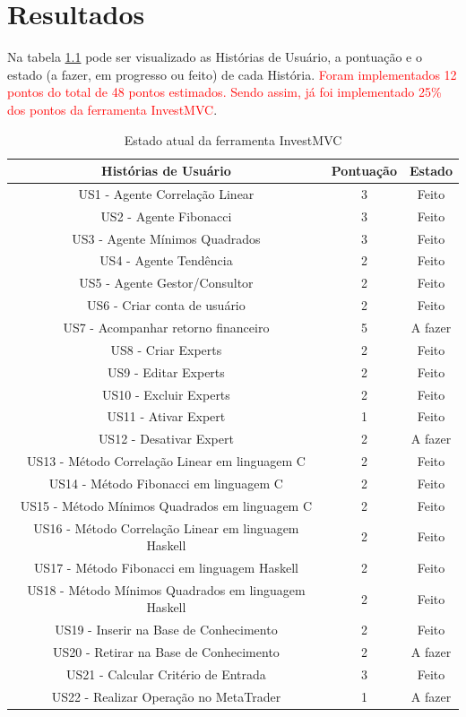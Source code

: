 \chapter{Resultados}

Na tabela \ref{estadoAtual} pode ser visualizado as Histórias de Usuário, a pontuação e o estado (a fazer, em progresso ou feito) de cada História. \textcolor{red}{Foram implementados 12 pontos do total de 48 pontos estimados. Sendo assim, já foi implementado 25\% dos pontos da ferramenta InvestMVC}.

\begin{table}[H]
\caption{Estado atual da ferramenta InvestMVC}
\begin{center}
    \begin{tabular}{ | c | c | c |}
    \hline
    \textbf{Histórias de Usuário} & \textbf{Pontuação} & \textbf{Estado} \\ \hline

US1 - Agente Correlação Linear & 3 & Feito\\ \hline
US2 - Agente Fibonacci & 3 & Feito \\ \hline
US3 - Agente Mínimos Quadrados & 3 & Feito\\ \hline
US4 -  Agente Tendência & 2 & Feito\\ \hline
US5 - Agente Gestor/Consultor & 2& Feito\\ \hline
US6 - Criar conta de usuário & 2 & Feito\\ \hline
US7 - Acompanhar retorno financeiro & 5 & A fazer\\ \hline
US8 - Criar Experts & 2 & Feito\\ \hline
US9 - Editar Experts & 2 & Feito\\ \hline
US10 - Excluir Experts & 2 & Feito\\ \hline
US11 - Ativar Expert & 1 & Feito\\ \hline
US12 - Desativar Expert & 2 & A fazer \\ \hline
US13 - Método Correlação Linear em linguagem C & 2 & Feito\\ \hline
US14 - Método Fibonacci em linguagem C & 2 & Feito\\ \hline
US15 - Método Mínimos Quadrados em linguagem C & 2 & Feito\\ \hline
US16 - Método Correlação Linear em linguagem Haskell & 2 & Feito\\ \hline
US17 - Método Fibonacci em linguagem Haskell & 2 & Feito\\ \hline
US18 - Método Mínimos Quadrados em linguagem Haskell & 2 & Feito\\ \hline
US19 - Inserir na Base de Conhecimento & 2 & Feito\\ \hline
US20 - Retirar na Base de Conhecimento & 2 & A fazer\\ \hline
US21 - Calcular Critério de Entrada & 3 & Feito\\ \hline
US22 - Realizar Operação no MetaTrader& 1 & A fazer\\ \hline
\end{tabular}
\end{center}
\label{estadoAtual}
\end{table}


